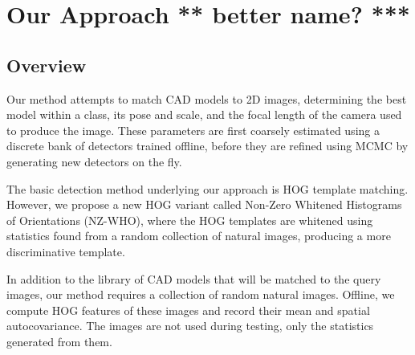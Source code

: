 \documentclass[10pt,twocolumn,letterpaper]{article}
\newcommand{\scream}[1]{{\color{red} \bf *** #1 ***}}
\begin{document}

\section{Our Approach \scream{better name?}}
\label{sec:nz-who}

\subsection{Overview}
Our method attempts to match CAD models to 2D images, determining the best
model within a class, its pose and scale, and the focal length of the camera
used to produce the image. These parameters are first coarsely estimated using
a discrete bank of detectors trained offline, before they are refined using
MCMC by generating new detectors on the fly.

The basic detection method underlying our approach is HOG template matching.
However, we propose a new HOG variant called Non-Zero Whitened Histograms of
Orientations (NZ-WHO), where the HOG templates are whitened using statistics
found from a random collection of natural images, producing a more
discriminative template.

In addition to the library of CAD models that will be matched to the query
images, our method requires a collection of random natural images. Offline, we
compute HOG features of these images and record their mean and spatial
autocovariance. The images are not used during testing, only the statistics
generated from them.
\end{document}
